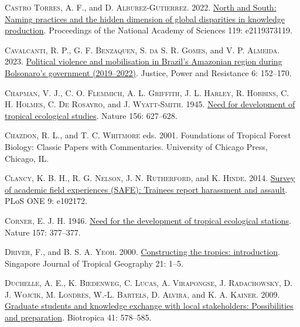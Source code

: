 \documentclass[
  12pt,
  man, donotrepeattitle,floatsintext]{apa6}
\newlength{\cslhangindent}
\newlength{\cslentryspacingunit} %
\newenvironment{CSLReferences}[2] %
 {%
  \setlength{\parindent}{0pt}
  \ifodd #1
  \let\oldpar\par
  \def\par{\hangindent=\cslhangindent\oldpar}
  \fi
  \setlength{\parskip}{#2\cslentryspacingunit}
 }%
 {}
\begin{document}
\begin{CSLReferences}{1}{0}
\leavevmode{}%
\textsc{Castro Torres, A. F.}, and \textsc{D. Alburez-Gutierrez}. 2022. \href{https://doi.org/10.1073/pnas.2119373119}{North and {South}: {Naming} practices and the hidden dimension of global disparities in knowledge production}. Proceedings of the National Academy of Sciences 119: e2119373119.

\leavevmode{}%
\textsc{Cavalcanti, R. P.}, \textsc{G. F. Benzaquen}, \textsc{S. da S. R. Gomes}, and \textsc{V. P. Almeida}. 2023. \href{https://doi.org/10.1332/SONH8866}{Political violence and mobilisation in {Brazil}'s {Amazonian} region during {Bolsonaro}'s government (2019--2022)}. Justice, Power and Resistance 6: 152--170.

\leavevmode{}%
\textsc{Chapman, V. J.}, \textsc{C. O. Flemmich}, \textsc{A. L. Griffith}, \textsc{J. L. Harley}, \textsc{R. Hobbins}, \textsc{C. H. Holmes}, \textsc{C. De Rosayro}, and \textsc{J. Wyatt-Smith}. 1945. \href{https://doi.org/10.1038/156627a0}{Need for development of tropical ecological studies}. Nature 156: 627--628.

\leavevmode{}%
\textsc{Chazdon, R. L.}, and \textsc{T. C. Whitmore} eds. 2001. Foundations of {Tropical Forest Biology}: {Classic Papers} with {Commentaries}. University of Chicago Press, Chicago, IL.

\leavevmode{}%
\textsc{Clancy, K. B. H.}, \textsc{R. G. Nelson}, \textsc{J. N. Rutherford}, and \textsc{K. Hinde}. 2014. \href{https://doi.org/10.1371/journal.pone.0102172}{Survey of academic field experiences ({SAFE}): Trainees report harassment and assault}. PLoS ONE 9: e102172.

\leavevmode{}%
\textsc{Corner, E. J. H.} 1946. \href{https://doi.org/10.1038/157377b0}{Need for the development of tropical ecological stations}. Nature 157: 377--377.

\leavevmode{}%
\textsc{Driver, F.}, and \textsc{B. S. A. Yeoh}. 2000. \href{https://doi.org/10.1111/1467-9493.00059}{Constructing the tropics: introduction}. Singapore Journal of Tropical Geography 21: 1--5.

\leavevmode{}%
\textsc{Duchelle, A. E.}, \textsc{K. Biedenweg}, \textsc{C. Lucas}, \textsc{A. Virapongse}, \textsc{J. Radachowsky}, \textsc{D. J. Wojcik}, \textsc{M. Londres}, \textsc{W.-L. Bartels}, \textsc{D. Alvira}, and \textsc{K. A. Kainer}. 2009. \href{https://doi.org/10.1111/j.1744-7429.2009.00563.x}{Graduate students and knowledge exchange with local stakeholders: Possibilities and preparation}. Biotropica 41: 578--585.


\end{CSLReferences}
\end{document}

